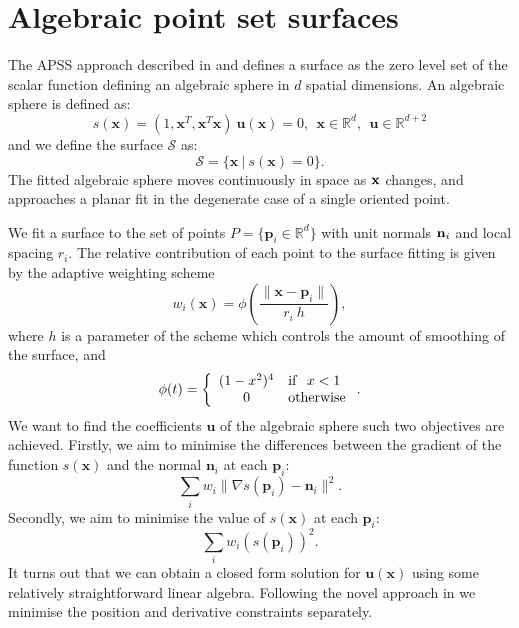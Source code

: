 \documentclass[final,3p,times,twocolumn]{elsarticle}
\begin{document}
\section{Algebraic point set surfaces}
\label{apss}


The APSS approach described in \cite{Guennebaud2007}
and \cite{Guennebaud2008} defines a surface as the zero level set of the 
scalar function defining an algebraic sphere in $d$ spatial dimensions.
An algebraic sphere is defined as:
\begin{equation}
\label{alph}
 s(\textbf{x}) = ( 1, \textbf{x}^T, \textbf{x}^T\textbf{x} ) \ \textbf{u}(\textbf{x}) = 0, \ \ \textbf{x} \in \mathbb{R}^d, \ \ \textbf{u} \in \mathbb{R}^{d+2} 
\end{equation}
and we define the surface $\mathcal{S}$ as:
\begin{equation}
 \mathcal{S} = \{ \textbf{x} \ | \ s(\textbf{x}) = 0 \}.
\end{equation}
The fitted algebraic sphere moves continuously in space as $\textbf x$ changes,
and approaches a planar fit in the degenerate case of a single oriented point.
\par
We fit a surface to the set of points $ P = \{ \textbf{p}_i \in \mathbb{R}^d \} $ with unit normals $\textbf n_i$ and
local spacing $r_i$. The relative contribution of each point to the surface fitting is given by the adaptive
weighting scheme
\begin{equation}
 w_i(\textbf{x}) = \phi \left( \frac{ \lVert \textbf{x} - \textbf{p}_i \rVert}{r_i \ h} \right),
\end{equation}
where $h$ is a parameter of the scheme which controls the amount of smoothing of the surface, and
\begin{equation}
 \phi (t) = 
 \left\{ 
 \begin{array}{c l} 
 (1-x^2)^4 & \mathrm{if} \ \ x < 1 \\ 
 0 & \mathrm{otherwise} 
 \end{array} 
 \right. .
\end{equation}
We want to find the coefficients $\textbf{u}$ of the algebraic sphere such two objectives
are achieved. Firstly, we aim to minimise the differences between the gradient of the 
function $s(\textbf{x})$ and the normal $\textbf{n}_i$ at each $\textbf{p}_i$:
\begin{equation}
\label{deriv}
 \sum_i w_i \lVert \nabla s(\textbf{p}_i) - \textbf{n}_i \rVert^2 .
\end{equation}
Secondly, we aim to minimise the value of $s(\textbf{x})$ at each $\textbf{p}_i$:
\begin{equation}
 \sum_i w_i (s(\textbf{p}_i))^2.
\end{equation}
It turns out that we can obtain a closed form solution for $\textbf{u}(\textbf{x})$ using some
relatively straightforward linear algebra. Following the novel approach in \cite{Guennebaud2008}
we minimise the position and derivative constraints separately. 
\end{document}
